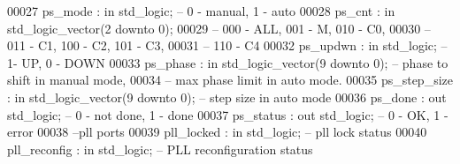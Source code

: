 \begin{DoxyCode}
00027       \textcolor{vhdlchar}{ps_mode}           \textcolor{vhdlchar}{:} \textcolor{keywordflow}{in} \textcolor{comment}{std\_logic};\textcolor{keyword}{ -- 0 - manual, 1 - auto}
00028       \textcolor{vhdlchar}{ps_cnt}            \textcolor{vhdlchar}{:} \textcolor{keywordflow}{in} \textcolor{comment}{std\_logic\_vector}\textcolor{vhdlchar}{(}\textcolor{vhdllogic}{}\textcolor{vhdllogic}{2} \textcolor{keywordflow}{downto} \textcolor{vhdllogic}{}\textcolor{vhdllogic}{0}\textcolor{vhdlchar}{)}; 
00029 \textcolor{keyword}{                                                   -- 000 - ALL, 001 -   M, 010 - C0,}
00030 \textcolor{keyword}{                                                   -- 011 -  C1, 100 -  C2, 101 - C3,}
00031 \textcolor{keyword}{                                                   -- 110 -  C4}
00032       \textcolor{vhdlchar}{ps_updwn}          \textcolor{vhdlchar}{:} \textcolor{keywordflow}{in} \textcolor{comment}{std\_logic};\textcolor{keyword}{ -- 1- UP, 0 - DOWN}
00033       \textcolor{vhdlchar}{ps_phase}          \textcolor{vhdlchar}{:} \textcolor{keywordflow}{in} \textcolor{comment}{std\_logic\_vector}\textcolor{vhdlchar}{(}\textcolor{vhdllogic}{}\textcolor{vhdllogic}{9} \textcolor{keywordflow}{downto} \textcolor{vhdllogic}{}\textcolor{vhdllogic}{0}\textcolor{vhdlchar}{)};\textcolor{keyword}{ -- phase to shift in manual mode, }
00034 \textcolor{keyword}{                                                           -- max phase limit in auto mode.}
00035       \textcolor{vhdlchar}{ps_step_size}      \textcolor{vhdlchar}{:} \textcolor{keywordflow}{in} \textcolor{comment}{std\_logic\_vector}\textcolor{vhdlchar}{(}\textcolor{vhdllogic}{}\textcolor{vhdllogic}{9} \textcolor{keywordflow}{downto} \textcolor{vhdllogic}{}\textcolor{vhdllogic}{0}\textcolor{vhdlchar}{)};\textcolor{keyword}{ -- step size in auto mode}
00036       \textcolor{vhdlchar}{ps_done}           \textcolor{vhdlchar}{:} \textcolor{keywordflow}{out} \textcolor{comment}{std\_logic};\textcolor{keyword}{ -- 0 - not done,  1 - done}
00037       \textcolor{vhdlchar}{ps_status}         \textcolor{vhdlchar}{:} \textcolor{keywordflow}{out} \textcolor{comment}{std\_logic};\textcolor{keyword}{ -- 0 - OK, 1 - error      }
00038 \textcolor{keyword}{      --pll ports}
00039       \textcolor{vhdlchar}{pll_locked}        \textcolor{vhdlchar}{:} \textcolor{keywordflow}{in} \textcolor{comment}{std\_logic};\textcolor{keyword}{  -- pll lock status}
00040       \textcolor{vhdlchar}{pll_reconfig}      \textcolor{vhdlchar}{:} \textcolor{keywordflow}{in} \textcolor{comment}{std\_logic};\textcolor{keyword}{  -- PLL reconfiguration status}

\end{DoxyCode}
